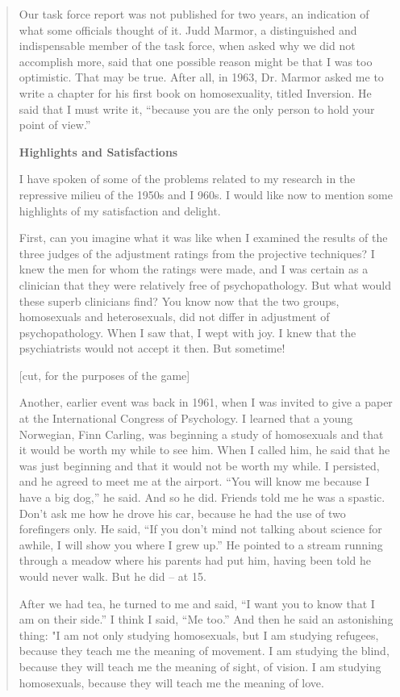 \begin{refsection}
\begin{quote}
Our task force report was not published for two years, an indication of what some officials thought of it. Judd Marmor, a distinguished and indispensable member of the task force, when asked why we did not accomplish more, said that one possible reason might be that I was too optimistic. That may be true. After all, in 1963, Dr. Marmor asked me to write a chapter for his first book on homosexuality, titled Inversion. He said that I must write it, ``because you are the only person to hold your point of view.''

\textbf{Highlights and Satisfactions} 

I have spoken of some of the problems related to my research in the repressive milieu of the 1950s and I 960s. I would like now to mention some highlights of my satisfaction and delight.

First, can you imagine what it was like when I examined the results of the three judges of the adjustment ratings from the projective techniques? I knew the men for whom the ratings were made, and I was certain as a clinician that they were relatively free of psychopathology. But what would these superb clinicians find? You know now that the two groups, homosexuals and heterosexuals, did not differ in adjustment of psychopathology. When I saw that, I wept with joy. I knew that the psychiatrists would not accept it then. But sometime!

[cut, for the purposes of the game]

Another, earlier event was back in 1961, when I was invited to give a paper at the International Congress of Psychology. I learned that a young Norwegian, Finn Carling, was beginning a study of homosexuals and that it would be worth my while to see him. When I called him, he said that he was just beginning and that it would not be worth my while. I persisted, and he agreed to meet me at the airport. ``You will know me because I have a big dog,'' he said. And so he did. Friends told me he was a spastic. Don't ask me how he drove his car, because he had the use of two forefingers only. He said, ``If you don't mind not talking about science for awhile, I will show you where I grew up.'' He pointed to a stream running through a meadow where his parents had put him, having been told he would never walk. But he did – at 15.

After we had tea, he turned to me and said, ``I want you to know that I am on their side.'' I think I said, ``Me too.'' And then he said an astonishing thing: "I am not only studying homosexuals, but I am studying refugees, because they teach me the meaning of movement. I am studying the blind, because they will teach me the meaning of sight, of vision. I am studying homosexuals, because they will teach me the meaning of love.


\end{quote}
\end{refsection}
